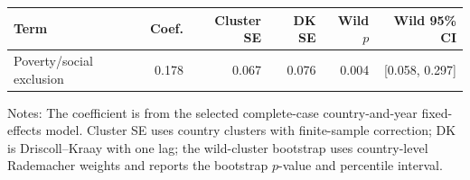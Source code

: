 \begin{tabular}{@{}lrrrrr@{}}
\toprule
Term & Coef. & Cluster SE & DK SE & Wild \(p\) & Wild 95\% CI \\
\midrule
Poverty/social exclusion & 0.178 & 0.067 & 0.076 & 0.004 & [0.058, 0.297] \\
\bottomrule
\end{tabular}

\vspace{0.2em}
\begin{minipage}{0.94\textwidth}\scriptsize Notes: The coefficient is from the selected complete-case country-and-year fixed-effects model. Cluster SE uses country clusters with finite-sample correction; DK is Driscoll--Kraay with one lag; the wild-cluster bootstrap uses country-level Rademacher weights and reports the bootstrap \(p\)-value and percentile interval.\end{minipage}
